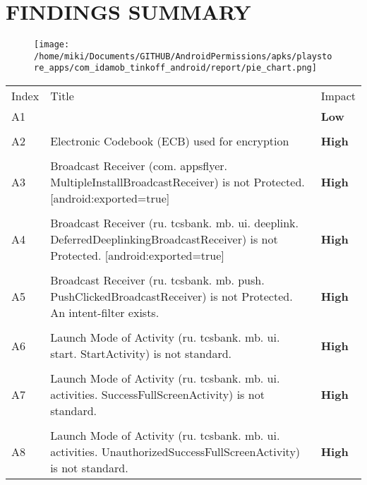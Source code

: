 \documentclass[12p]{article}
\begin{document}
\section{FINDINGS SUMMARY}\label{sec:summary}
\begin{figure}[H]
\centering
	\texttt{[image: /home/miki/Documents/GITHUB/AndroidPermissions/apks/playstore\_apps/com\_idamob\_tinkoff\_android/report/pie\_chart.png]}
\end{figure}
	\begin{longtable}{p{0.5cm} p{10cm} p{1.5cm}}
	\rowcolor{grannysmithapple!70} Index & Title & Impact \\
	A1&& \color{amber}\textbf{Low} \\
\hline\\	A2&Electronic Codebook \newline (ECB) used for encryption& \color{ferrarired}\textbf{High} \\
\hline\\	A3&Broadcast Receiver \newline (com. appsflyer. MultipleInstallBroadcastReceiver) is not Protected. [android:exported=true]& \color{ferrarired}\textbf{High} \\
\hline\\	A4&Broadcast Receiver \newline (ru. tcsbank. mb. ui. deeplink. DeferredDeeplinkingBroadcastReceiver) is not Protected. [android:exported=true]& \color{ferrarired}\textbf{High} \\
\hline\\	A5&Broadcast Receiver \newline (ru. tcsbank. mb. push. PushClickedBroadcastReceiver) is not Protected. An intent-filter exists.& \color{ferrarired}\textbf{High} \\
\hline\\	A6&Launch Mode of Activity \newline (ru. tcsbank. mb. ui. start. StartActivity) is not standard.& \color{ferrarired}\textbf{High} \\
\hline\\	A7&Launch Mode of Activity \newline (ru. tcsbank. mb. ui. activities. SuccessFullScreenActivity) is not standard.& \color{ferrarired}\textbf{High} \\
\hline\\	A8&Launch Mode of Activity \newline (ru. tcsbank. mb. ui. activities. UnauthorizedSuccessFullScreenActivity) is not standard.& \color{ferrarired}\textbf{High} \\

\end{longtable}
\end{document}
